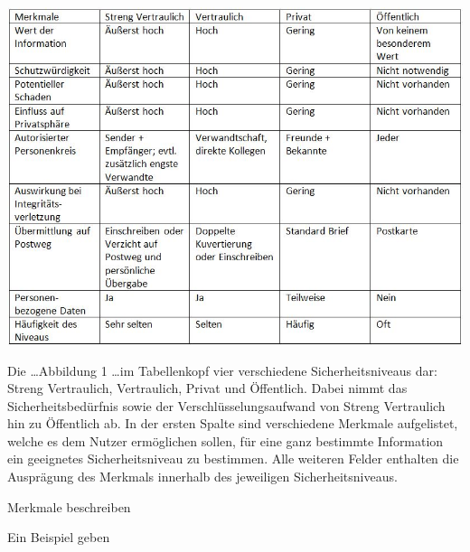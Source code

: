 \includegraphics{images/sicherheitsniveaus.jpg}

Die \dots Abbildung 1 \dots im Tabellenkopf vier verschiedene Sicherheitsniveaus dar: Streng Vertraulich, Vertraulich, Privat und Öffentlich. Dabei nimmt das Sicherheitsbedürfnis sowie der Verschlüsselungsaufwand von Streng Vertraulich hin zu Öffentlich ab.
In der ersten Spalte sind verschiedene Merkmale aufgelistet, welche es dem Nutzer ermöglichen sollen, für eine ganz bestimmte Information ein geeignetes Sicherheitsniveau zu bestimmen.
Alle weiteren Felder enthalten die Ausprägung des Merkmals innerhalb des jeweiligen Sicherheitsniveaus.


Merkmale beschreiben

Ein Beispiel geben

